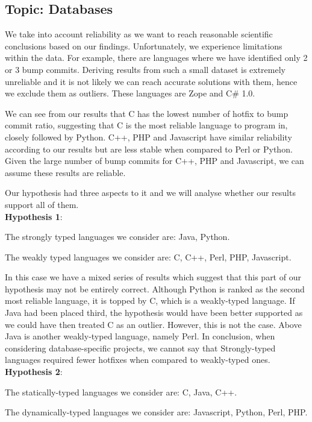 \subsection{Topic: Databases}
We take into account reliability as we want to reach reasonable scientific conclusions based on our findings. Unfortunately, we experience limitations within the data. For example, there are languages where we have identified only 2 or 3 bump commits. Deriving results from such a small dataset is extremely unreliable and it is not likely we can reach accurate solutions with them, hence we exclude them as outliers. These languages are Zope and C\# 1.0.\par
We can see from our results that C has the lowest number of hotfix to bump commit ratio, suggesting that C is the most reliable language to program in, closely followed by Python. C++, PHP and Javascript have similar reliability according to our results but are less stable when compared to Perl or Python. Given the large number of bump commits for C++, PHP and Javascript, we can assume these results are reliable.\par
Our hypothesis had three aspects to it and we will analyse whether our results support all of them.\\

\textbf{Hypothesis 1}:\par
The strongly typed languages we consider are: Java, Python.\par
The weakly typed languages we consider are: C, C++, Perl, PHP, Javascript.\par
In this case we have a mixed series of results which suggest that this part of our hypothesis may not be entirely correct. Although Python is ranked as the second most reliable language, it is topped by C, which is a weakly-typed language. If Java had been placed third,  the hypothesis would have been better supported as we could have then treated C as an outlier. However, this is not the case. Above Java is another weakly-typed language, namely Perl. In conclusion, when considering database-specific projects, we cannot say that Strongly-typed languages required fewer hotfixes when compared to weakly-typed ones.\\

\textbf{Hypothesis 2}:\par
The statically-typed languages we consider are: C, Java, C++.\par
The dynamically-typed languages we consider are: Javascript, Python, Perl, PHP.\par

